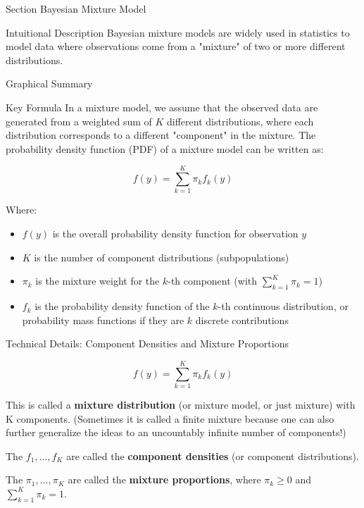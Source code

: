 
\begin{frame}{Section}
\centering
\Huge{Bayesian Mixture Model}
\end{frame}


\begin{frame}{Intuitional Description}
Bayesian mixture models are widely used in statistics to model data where observations come from a "mixture" of two or more different distributions.
\end{frame}

\begin{frame}{Graphical Summary}

\end{frame}


\begin{frame}{Key Formula}
In a mixture model, we assume that the observed data are generated from a weighted sum of $K$ different distributions, where each distribution corresponds to a different "component" in the mixture. The probability density function (PDF) of a mixture model can be written as:

$$
f(y) = \sum_{k=1}^{K} \pi_k f_k(y)
$$

Where:

\begin{itemize}
\item $f(y)$ is the overall probability density function for observation $y$
\item $K$ is the number of component distributions (subpopulations)
\item $\pi_k$ is the mixture weight for the $k$-th component (with $\sum_{k=1}^{K} \pi_k = 1$)
\item $f_k$ is the probability density function of the $k$-th continuous distribution, or probability mass functions if they are $k$ discrete contributions
\end{itemize}

\end{frame}


\begin{frame}{Technical Details: Component Densities and Mixture Proportions}

$$
f(y) = \sum_{k=1}^{K} \pi_k f_k(y)
$$

This is called a \textbf{mixture distribution} (or mixture model, or just mixture) with K components. (Sometimes it is called a finite mixture because one can also further generalize the ideas to an uncountably infinite number of components!)

The $f_1,…,f_K$ are called the \textbf{component densities} (or component distributions).

The $\pi_1,…,\pi_K$ are called the \textbf{mixture proportions}, where $\pi_k \geq 0$ and $\sum_{k=1}^K \pi_k=1$.

\end{frame}

